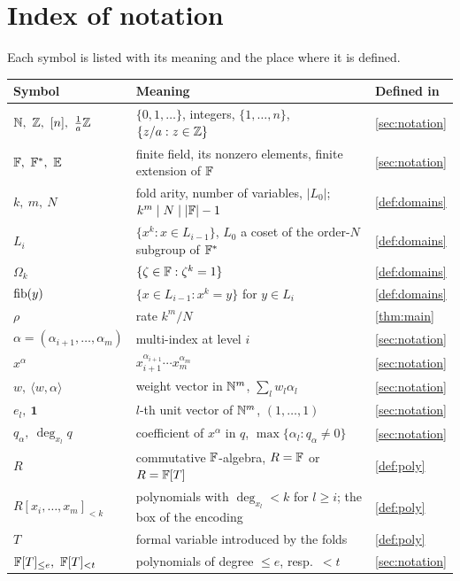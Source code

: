 \section{Index of notation}\label{app:notation}

Each symbol is listed with its meaning and the place where it is defined.

{\small
\begin{longtable}{@{}p{}p{}p{}@{}}
\toprule
Symbol & Meaning & Defined in\\
\midrule
\endhead
$\N,\ \Z,\ [n],\ \frac1a\Z$ & $\{0,1,\dots\}$, integers, $\{1,\dots,n\}$, $\{z/a:z\in\mathbb{Z}\}$ & \cref{sec:notation}\\
$\F,\ \F^*,\ \E$ & finite field, its nonzero elements, finite extension of $\mathbb{F}$ & \cref{sec:notation}\\
$k,\ m,\ N$ & fold arity, number of variables, $|L_0|$; $k^m\mid N\mid|\mathbb{F}|-1$ & \cref{def:domains}\\
$L_i$ & $\{x^k:x\in L_{i-1}\}$, $L_0$ a coset of the order-$N$ subgroup of $\mathbb{F}^*$ & \cref{def:domains}\\
$\Omega_k$ & $\{\zeta\in\mathbb{F}:\zeta^k=1\}$ & \cref{def:domains}\\
$\mathrm{fib}(y)$ & $\{x\in L_{i-1}:x^k=y\}$ for $y\in L_i$ & \cref{def:domains}\\
$\rho$ & rate $k^m/N$ & \cref{thm:main}\\
$\alpha=(\alpha_{i+1},\dots,\alpha_m)$ & multi-index at level $i$ & \cref{sec:notation}\\
$x^\alpha$ & $x_{i+1}^{\alpha_{i+1}}\cdots x_m^{\alpha_m}$ & \cref{sec:notation}\\
$w,\ \langle w,\alpha\rangle$ & weight vector in $\mathbb{N}^m$, $\sum_lw_l\alpha_l$ & \cref{sec:notation}\\
$e_l,\ \mathbf 1$ & $l$-th unit vector of $\mathbb{N}^m$, $(1,\dots,1)$ & \cref{sec:notation}\\
$q_\alpha,\ \deg_{x_l}q$ & coefficient of $x^\alpha$ in $q$, $\max\{\alpha_l:q_\alpha\ne0\}$ & \cref{sec:notation}\\
$R$ & commutative $\mathbb{F}$-algebra, $R=\mathbb{F}$ or $R=\mathbb{F}[T]$ & \cref{def:poly}\\
$R[x_i,\dots,x_m]_{<k}$ & polynomials with $\deg_{x_l}<k$ for $l\ge i$; the box of the encoding & \cref{def:poly}\\
$T$ & formal variable introduced by the folds & \cref{def:poly}\\
$\F[T]_{\le e},\ \F[T]_{<t}$ & polynomials of degree $\le e$, resp.\ $<t$ & \cref{sec:notation}\\

\end{longtable}}
